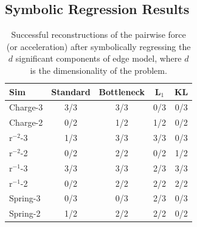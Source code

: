 \documentclass[11pt]{article}
\begin{document}
\subsection{Symbolic Regression Results}
    \begin{table}[H]
        \centering
        \begin{tabular}{lcccc}
        \hline
        Sim & Standard & Bottleneck & L$_1$ & KL \\
        \hline
        Charge-3 & 3/3 & 3/3 & 0/3 & 0/3 \\
        Charge-2 & 0/2 & 1/2 & 1/2 & 0/2 \\
        r$^{-2}$-3 & 1/3 & 3/3 & 3/3 & 0/3 \\
        r$^{-2}$-2 & 0/2 & 2/2 & 0/2 & 1/2 \\
        r$^{-1}$-3 & 3/3 & 3/3 & 2/3 & 3/3 \\
        r$^{-1}$-2 & 0/2 & 2/2 & 2/2 & 2/2 \\
        Spring-3 & 0/3 & 0/3 & 2/3  & 0/3 \\
        Spring-2 & 1/2 & 2/2 & 2/2 & 0/2 \\
        \hline
        \end{tabular}
        \caption{Successful reconstructions of the pairwise force (or acceleration) after symbolically regressing the $d$ significant components of edge model, where $d$ is the dimensionality of the problem.}
        \label{tab:sr_edge_model_table}
    \end{table}
\end{document}
